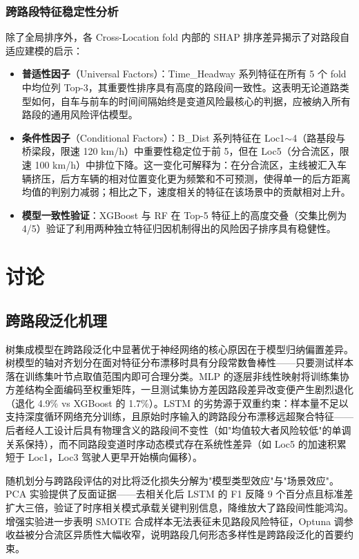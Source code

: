 \documentclass[preprint,review,12pt,a4paper]{elsarticle}
\begin{document}
\subsubsection{跨路段特征稳定性分析}

除了全局排序外，各 Cross-Location fold 内部的 SHAP 排序差异揭示了对路段自适应建模的启示：

\begin{itemize}
  \item \textbf{普适性因子}（Universal Factors）：Time\_Headway 系列特征在所有 5 个 fold 中均位列 Top-3，其重要性排序具有高度的路段间一致性。这表明无论道路类型如何，自车与前车的时间间隔始终是变道风险最核心的判据，应被纳入所有路段的通用风险评估模型。

  \item \textbf{条件性因子}（Conditional Factors）：B\_Dist 系列特征在 Loc1$\sim$4（路基段与桥梁段，限速 120 km/h）中重要性稳定位于前 5，但在 Loc5（分合流区，限速 100 km/h）中排位下降。这一变化可解释为：在分合流区，主线被汇入车辆挤压，后方车辆的相对位置变化更为频繁和不可预测，使得单一的后方距离均值的判别力减弱；相比之下，速度相关的特征在该场景中的贡献相对上升。

  \item \textbf{模型一致性验证}：XGBoost 与 RF 在 Top-5 特征上的高度交叠（交集比例为 4/5）验证了利用两种独立特征归因机制得出的风险因子排序具有稳健性。
\end{itemize}

\section{讨论}

\subsection{跨路段泛化机理}

树集成模型在跨路段泛化中显著优于神经网络的核心原因在于模型归纳偏置差异。树模型的轴对齐划分在面对特征分布漂移时具有分段常数鲁棒性——只要测试样本落在训练集叶节点取值范围内即可合理分类。MLP 的逐层非线性映射将训练集协方差结构全面编码至权重矩阵，一旦测试集协方差因路段差异改变便产生剧烈退化（退化 4.9\% vs XGBoost 的 1.7\%）。LSTM 的劣势源于双重约束：样本量不足以支持深度循环网络充分训练，且原始时序输入的跨路段分布漂移远超聚合特征——后者经人工设计后具有物理含义的路段间不变性（如"均值较大者风险较低"的单调关系保持），而不同路段变道时序动态模式存在系统性差异（如 Loc5 的加速积累短于 Loc1，Loc3 驾驶人更早开始横向偏移）。

随机划分与跨路段评估的对比将泛化损失分解为"模型类型效应"与"场景效应"。PCA 实验提供了反面证据——去相关化后 LSTM 的 F1 反降 9 个百分点且标准差扩大三倍，验证了时序相关模式承载关键判别信息，降维放大了路段间性能鸿沟。增强实验进一步表明 SMOTE 合成样本无法表征未见路段风险特征，Optuna 调参收益被分合流区异质性大幅收窄，说明路段几何形态多样性是跨路段泛化的首要约束。
\end{document}
